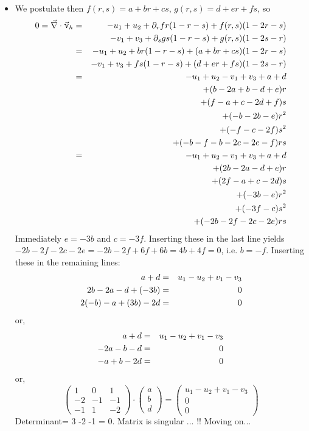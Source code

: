 \begin{itemize}
\item
We postulate then $f(r,s)=a+br+cs$, $g(r,s)=d+er+fs$, so  
\begin{eqnarray}
0=\vec\nabla\cdot\vec\upnu_h 
&=& -u_1+u_2 + \partial_r f r(1-r-s) + f(r,s)(1-2r-s) \nonumber\\
&&  -v_1+v_3 + \partial_s g s(1-r-s) + g(r,s)(1-2s-r) \nonumber\\
&=& -u_1+u_2 + b r(1-r-s) + (a+br+cs) (1-2r-s) \nonumber\\
&&  -v_1+v_3 + f s(1-r-s) + (d+er+fs)(1-2s-r) \nonumber\\
&=& -u_1+u_2  -v_1+v_3 + a + d \nonumber\\
&& +(b-2a+b-d+e)r \nonumber\\
&& +(f-a+c-2d+f)s \nonumber\\
&& +(-b-2b-e)r^2 \nonumber\\
&& +(-f-c-2f)s^2 \nonumber\\
&& +(-b-f-b-2c-2e-f)rs \nonumber\\
&=& -u_1+u_2  -v_1+v_3 + a + d \nonumber\\
&& +(2b-2a-d+e)r \nonumber\\
&& +(2f-a+c-2d)s \nonumber\\
&& +(-3b-e)r^2 \nonumber\\
&& +(-3f-c)s^2 \nonumber\\
&& +(-2b-2f-2c-2e)rs  \nonumber
\end{eqnarray}
Immediately $e=-3b$ and $c=-3f$. Inserting these in the last line yields
$-2b-2f-2c-2e=-2b-2f+6f+6b=4b+4f=0$, i.e. $b=-f$.
Inserting these in the remaining lines:
\begin{eqnarray}
a+d &=& u_1-u_2  +v_1-v_3 \nonumber\\
2b-2a-d+(-3b) &=& 0 \nonumber\\
2(-b)-a+(3b)-2d &=& 0 \nonumber
\end{eqnarray}
or,
\begin{eqnarray}
a+d &=& u_1-u_2  +v_1-v_3 \nonumber\\
-2a-b-d &=& 0 \nonumber\\
-a + b-2d &=& 0 \nonumber
\end{eqnarray}
or, 
\[
\left(
\begin{array}{ccc}
1 &0 & 1 \\
-2 & -1 & -1 \\
-1 & 1 & -2 
\end{array}
\right)
\cdot
\left(
\begin{array}{c}
a \\ b  \\d 
\end{array}
\right)
=
\left(
\begin{array}{c}
u_1-u_2+v_1-v_3 \\
0 \\ 0 
\end{array}
\right)
\]
Determinant= 3 -2 -1 = 0. Matrix is singular ... !! Moving on...


\end{itemize}
